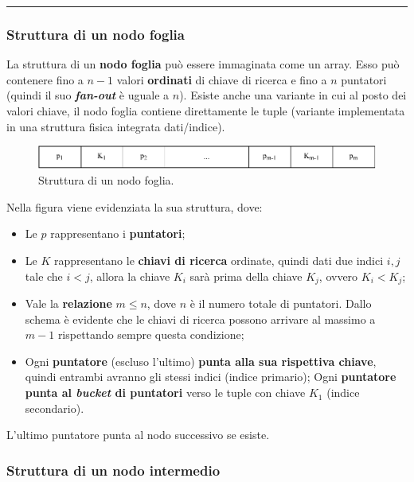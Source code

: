\documentclass[a4paper]{article}
\newcommand{\longline}{\noindent\rule{\textwidth}{0.4pt}}
\begin{document}
	\longline
	
	\subsubsection{Struttura di un nodo foglia}
	
	La struttura di un \textcolor{Red3}{\textbf{nodo foglia}} può essere immaginata come un array. Esso può contenere fino a $n-1$ valori \textbf{ordinati} di chiave di ricerca e fino a $n$ puntatori (quindi il suo \textcolor{Red3}{\textbf{\emph{fan-out}}} è uguale a $n$). Esiste anche una variante in cui al posto dei valori chiave, il nodo foglia contiene direttamente le tuple (variante implementata in una struttura fisica integrata dati/indice).
	\begin{figure}[!htp]
		\centering
		\includegraphics[width=\textwidth]{img/B+-tree_foglia.pdf}
		\caption{Struttura di un nodo foglia.}
	\end{figure}
	
	\noindent
	Nella figura viene evidenziata la sua struttura, dove:
	\begin{itemize}
		\item Le $p$ rappresentano i \textbf{puntatori};
		
		\item Le $K$ rappresentano le \textbf{chiavi di ricerca} ordinate, quindi dati due indici $i,j$ tale che $i<j$, allora la chiave $K_{i}$ sarà prima della chiave $K_{j}$, ovvero $K_{i} < K_{j}$;
		
		\item Vale la \textbf{relazione} $m \le n$, dove $n$ è il numero totale di puntatori. Dallo schema è evidente che le chiavi di ricerca possono arrivare al massimo a $m-1$ rispettando sempre questa condizione;
		
		\item Ogni \textbf{puntatore} (escluso l'ultimo) \textbf{punta alla sua rispettiva chiave}, quindi entrambi avranno gli stessi indici (indice primario);\newline
		Ogni \textbf{puntatore punta al \emph{bucket} di puntatori} verso le tuple con chiave $K_{1}$ (indice secondario).
	\end{itemize}
	L'ultimo puntatore punta al nodo successivo se esiste.\newpage
	
	\subsubsection{Struttura di un nodo intermedio}
	
\end{document}
